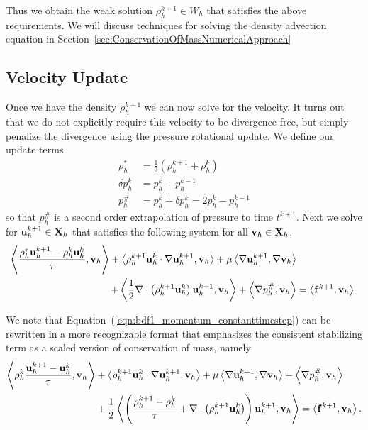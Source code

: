 \documentclass[letterpaper]{erdc}
\begin{document}
Thus we obtain the weak solution $\rho_h^{k+1}\in W_h$ that satisfies the above requirements.  We will discuss techniques for solving the density advection equation in Section~\ref{sec:ConservationOfMassNumericalApproach}

%
\subsection{Velocity Update}
Once we have the density $\rho_h^{k+1}$ we can now solve for the velocity.  It turns out that we do not explicitly require this velocity to be divergence free, but simply penalize the divergence using the pressure rotational update.  We define our update terms
\begin{align*}
  \rho_h^{*} &= \frac{1}{2}\left( \rho_h^{k+1} + \rho_h^{k} \right)\\
  \delta p_h^{k} &= p_h^{k} - p_h^{k-1}\\
    p_h^{\#} &= p_h^{k} + \delta p_h^{k} = 2p_h^{k} - p_h^{k-1}
\end{align*}
so that $p_h^{\#}$ is a second order extrapolation of pressure to time $t^{k+1}$.  Next we  solve for $\textbf{u}_h^{k+1}\in\textbf{X}_h$ that satisfies the following system for all $\textbf{v}_h\in\textbf{X}_h$,
\begin{equation}\label{eqn:bdf1_momentum_constanttimestep}
  \begin{split}
\left\langle  \frac{\rho_h^{*}\textbf{u}_h^{k+1}-\rho_h^{k}\textbf{u}_h^{k} }{\tau} , \textbf{v}_h \right\rangle + \left\langle  \rho_h^{k+1}\textbf{u}_h^{k}\cdot\nabla\textbf{u}_h^{k+1} , \textbf{v}_h \right\rangle+ \mu\left\langle  \nabla \textbf{u}_h^{k+1} , \nabla\textbf{v}_h \right\rangle&\\
 + \left\langle  \frac{1}{2}\nabla\cdot\left(\rho_h^{k+1}\textbf{u}_h^{k}\right)\textbf{u}_h^{k+1} , \textbf{v}_h \right\rangle +\left\langle \nabla p_h^{\#}, \textbf{v}_h \right\rangle &= \left\langle \mathbf{f}^{k+1}, \textbf{v}_h \right\rangle.
\end{split}
\end{equation}

We note that Equation~(\ref{eqn:bdf1_momentum_constanttimestep}) can be rewritten in a more recognizable format that emphasizes the consistent stabilizing term as a scaled version of conservation of mass, namely
\begin{equation}\label{eqn:bdf1morerecognizableform}
  \begin{split}
\left\langle \rho_h^{k} \frac{\textbf{u}_h^{k+1}-\textbf{u}_h^{k} }{\tau} , \textbf{v}_h \right\rangle &+ \left\langle  \rho_h^{k+1}\textbf{u}_h^{k}\cdot\nabla\textbf{u}_h^{k+1} , \textbf{v}_h \right\rangle + \mu\left\langle  \nabla \textbf{u}_h^{k+1} , \nabla\textbf{v}_h \right\rangle+\left\langle \nabla p_h^{\#}, \textbf{v}_h \right\rangle\\
 &+ \frac{1}{2}\left\langle  \left(\frac{\rho_h^{k+1} - \rho_h^{k}}{\tau} + \nabla\cdot\left(\rho_h^{k+1}\textbf{u}_h^{k}\right)  \right )\textbf{u}_h^{k+1} , \textbf{v}_h \right\rangle = \left\langle \mathbf{f}^{k+1}, \textbf{v}_h \right\rangle.
\end{split}
\end{equation}
\end{document}
